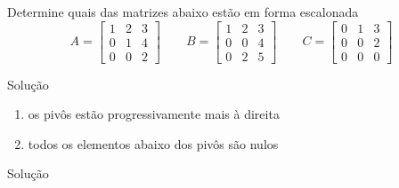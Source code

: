 \begin{question}
Determine quais das matrizes abaixo estão em forma escalonada
\[
  A =
  \begin{bmatrix}
    1 & 2 & 3 \\
    0 & 1 & 4 \\
    0 & 0 & 2
  \end{bmatrix}
  \qquad
  B =
  \begin{bmatrix}
    1 & 2 & 3 \\
    0 & 0 & 4 \\
    0 & 2 & 5
  \end{bmatrix}
  \qquad
  C =
  \begin{bmatrix}
    0 & 1 & 3 \\
    0 & 0 & 2 \\
    0 & 0 & 0
  \end{bmatrix}
\]
\end{question}

\begin{resolutiont}{Solução}
\onslide<+->{\[
  A = \begin{bmatrix}
    1 & 2 & 3 \\
    0 & 1 & 4 \\
    0 & 0 & 2
  \end{bmatrix}
\]}
\begin{enumerate}[<+->]
  \item os pivôs estão progressivamente mais à direita
  \item todos os elementos abaixo dos pivôs são nulos
\end{enumerate}
\end{resolutiont}

\begin{resolutiont}{Solução}
\onslide<+->{\[
  B = \begin{bmatrix}
    1 & 2                   & 3                   \\
    0 & 0                   & {\color<3->{red} 4} \\
    0 & {\color<3->{red} 2} & 5
  \end{bmatrix}
\]}%
  \\

\bigskip
{}
\end{resolutiont}

